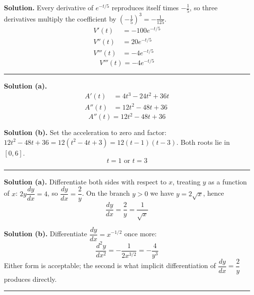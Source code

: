 \documentclass[12pt]{article}
\begin{document}
\textbf{Solution.} Every derivative of $e^{-t/5}$ reproduces itself times
$-\tfrac{1}{5}$, so three derivatives multiply the coefficient by
$\left(-\tfrac{1}{5}\right)^3 = -\tfrac{1}{125}$.
\begin{align*}
  V'(t)   &= -100e^{-t/5} \\
  V''(t)  &= 20e^{-t/5} \\
  V'''(t) &= -4e^{-t/5}
\end{align*}
\[ \boxed{V'''(t) = -4e^{-t/5}} \]

\vspace{0.2cm}\noindent\rule{\linewidth}{0.2pt}


\textbf{Solution (a).}
\begin{align*}
  A'(t)  &= 4t^3 - 24t^2 + 36t \\
  A''(t) &= 12t^2 - 48t + 36
\end{align*}
\[ \boxed{A''(t) = 12t^2 - 48t + 36} \]

\textbf{Solution (b).} Set the acceleration to zero and factor:
$12t^2 - 48t + 36 = 12(t^2 - 4t + 3) = 12(t-1)(t-3)$. Both roots lie in
$[0, 6]$.
\[ \boxed{t = 1 \text{ or } t = 3} \]

\vspace{0.2cm}\noindent\rule{\linewidth}{0.2pt}


\textbf{Solution (a).} Differentiate both sides with respect to $x$, treating
$y$ as a function of $x$: $2y\dfrac{dy}{dx} = 4$, so
$\dfrac{dy}{dx} = \dfrac{2}{y}$. On the branch $y > 0$ we have
$y = 2\sqrt{x}$, hence
\[ \boxed{\dfrac{dy}{dx} = \dfrac{2}{y} = \dfrac{1}{\sqrt{x}}} \]

\textbf{Solution (b).} Differentiate $\dfrac{dy}{dx} = x^{-1/2}$ once more:
\[ \boxed{\dfrac{d^2y}{dx^2} = -\dfrac{1}{2x^{3/2}} = -\dfrac{4}{y^3}} \]
Either form is acceptable; the second is what implicit differentiation of
$\dfrac{dy}{dx} = \dfrac{2}{y}$ produces directly.

\vspace{0.2cm}\noindent\rule{\linewidth}{0.2pt}

\end{document}
